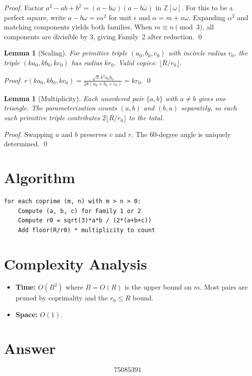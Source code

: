 \documentclass[12pt]{article}
\newtheorem{lemma}[theorem]{Lemma}
\begin{document}
\begin{proof}
Factor $a^2 - ab + b^2 = (a - b\omega)(a - b\bar{\omega})$ in $\mathbb{Z}[\omega]$. For this to be a perfect square, write $a - b\omega = \epsilon \alpha^2$ for unit $\epsilon$ and $\alpha = m + n\omega$. Expanding $\alpha^2$ and matching components yields both families. When $m \equiv n \pmod{3}$, all components are divisible by 3, giving Family~2 after reduction. \qed
\end{proof}

\begin{lemma}[Scaling]
For primitive triple $(a_0, b_0, c_0)$ with incircle radius $r_0$, the triple $(ka_0, kb_0, kc_0)$ has radius $kr_0$. Valid copies: $\lfloor R/r_0 \rfloor$.
\end{lemma}

\begin{proof}
$r(ka_0, kb_0, kc_0) = \frac{\sqrt{3}\,k^2 a_0 b_0}{2k(a_0+b_0+c_0)} = kr_0$. \qed
\end{proof}

\begin{lemma}[Multiplicity]
Each unordered pair $\{a, b\}$ with $a \neq b$ gives one triangle. The parameterization counts $(a,b)$ and $(b,a)$ separately, so each such primitive triple contributes $2\lfloor R/r_0 \rfloor$ to the total.
\end{lemma}

\begin{proof}
Swapping $a$ and $b$ preserves $c$ and $r$. The 60-degree angle is uniquely determined. \qed
\end{proof}

\section{Algorithm}

\begin{verbatim}
for each coprime (m, n) with m > n > 0:
    Compute (a, b, c) for Family 1 or 2
    Compute r0 = sqrt(3)*a*b / (2*(a+b+c))
    Add floor(R/r0) * multiplicity to count
\end{verbatim}

\section{Complexity Analysis}

\begin{itemize}
    \item \textbf{Time:} $O(B^2)$ where $B = O(R)$ is the upper bound on $m$. Most pairs are pruned by coprimality and the $r_0 \leq R$ bound.
    \item \textbf{Space:} $O(1)$.
\end{itemize}

\section{Answer}

\[
\boxed{75085391}
\]
\end{document}
